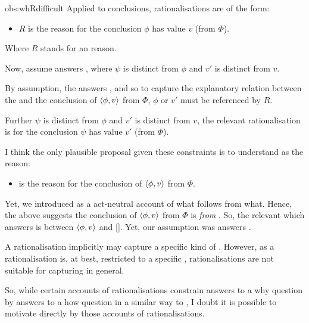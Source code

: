 \begin{note}
\begin{motivation}{obs:whRdifficult}
    Applied to conclusions, rationalisations are of the form:
    \begin{itemize}
    \item
      \(R\) is the \agents{} reason for the conclusion \(\phi\) has value \(v\) (from \(\Phi\)).
    \end{itemize}
    Where \(R\) stands for an \agents{} reason.

    Now, assume  answers \qWhy{}, where \(\psi\) is distinct from \(\phi\) and \(v'\) is distinct from \(v\).

    By assumption, the  answers \qWhy{}, and so to capture the explanatory relation between the \fingfr{} and the \agents{} conclusion of \(\langle\phi, v\rangle\) from \(\Phi\), \(\phi\) or \(v'\) must be referenced by \(R\).

    Further \(\psi\) is distinct from \(\phi\) and \(v'\) is distinct from \(v\), the relevant rationalisation is for the conclusion \(\psi\) has value \(v'\) (from \(\Phi\)).

    I think the only plausible proposal given these constraints is to understand  as the \agents{} reason:
    \begin{itemize}
    \item
       is the \agents{} reason for the conclusion of \(\langle\phi, v\rangle\) from \(\Phi\).
    \end{itemize}
    Yet, we introduced \fingfr{} as a act-neutral account of what follows from what.
    Hence, the above suggests the conclusion of \(\langle\phi, v\rangle\) from \(\Phi\) is \emph{from} .
    So, the relevant \fingfr{} which answers \qWhy{} is between \(\langle\phi, v\rangle\) and [].
    Yet, our assumption was  answers \qWhy{}.
  \end{motivation}

  \noindent%
  A rationalisation implicitly may capture a specific kind of \fingfr{}.
  However, as a rationalisation is, at best, restricted to a specific , rationalisations are not suitable for capturing  in general.

  So, while certain accounts of rationalisations constrain answers to a why question by answers to a how question in a similar way to \issueInclusion{}, I doubt it is possible to motivate \issueInclusion{} directly by those accounts of rationalisations.


\end{note}
